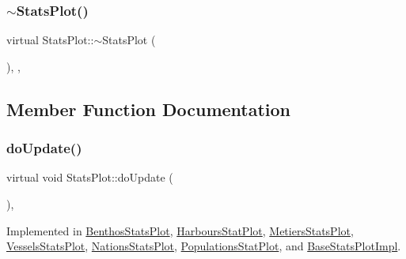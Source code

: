 \subsubsection{\texorpdfstring{$\sim$StatsPlot()}{~StatsPlot()}}
{\footnotesize\ttfamily virtual Stats\+Plot\+::$\sim$\+Stats\+Plot (\begin{DoxyParamCaption}{ }\end{DoxyParamCaption})\hspace{0.3cm}{\ttfamily [virtual]}, {\ttfamily [default]}, {\ttfamily [noexcept]}}



\subsection{Member Function Documentation}
\mbox{\label{class_stats_plot_a363a428cc00b389a55a03e6d5d7c526e}} 
\subsubsection{\texorpdfstring{doUpdate()}{doUpdate()}}
{\footnotesize\ttfamily virtual void Stats\+Plot\+::do\+Update (\begin{DoxyParamCaption}{ }\end{DoxyParamCaption})\hspace{0.3cm}{\ttfamily [protected]}, {}}



Implemented in \mbox{\hyperlink{class_benthos_stats_plot_a15bbfb2453268b8b9997ab1b794cb24f}{Benthos\+Stats\+Plot}}, \mbox{\hyperlink{class_harbours_stat_plot_ac00ff791bc72c0bf87c7c6832c24d162}{Harbours\+Stat\+Plot}}, \mbox{\hyperlink{class_metiers_stats_plot_a69af2cc87d8a30a7172f543973007f4e}{Metiers\+Stats\+Plot}}, \mbox{\hyperlink{class_vessels_stats_plot_a1886250b73f089bd1aca425d7323d743}{Vessels\+Stats\+Plot}}, \mbox{\hyperlink{class_nations_stats_plot_aee0dd7349472d05b13e5f4916380e117}{Nations\+Stats\+Plot}}, \mbox{\hyperlink{class_populations_stat_plot_aff1464474d75cbc646aa3bd9857cbc47}{Populations\+Stat\+Plot}}, and \mbox{\hyperlink{class_base_stats_plot_impl_a10523764ddeab4cc171b05daf3e7acaf}{Base\+Stats\+Plot\+Impl}}.

\mbox{\label{class_stats_plot_a30f70ce7b333628315ab0e226869cfbe}} 

